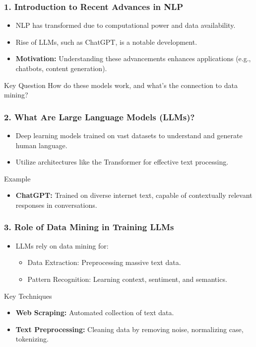 \documentclass[aspectratio=169]{beamer}
\begin{document}
\begin{frame}[fragile]
    \frametitle{1. Introduction to Recent Advances in NLP}
    \begin{itemize}
        \item NLP has transformed due to computational power and data availability.
        \item Rise of LLMs, such as ChatGPT, is a notable development.
        \item \textbf{Motivation:} Understanding these advancements enhances applications (e.g., chatbots, content generation).
    \end{itemize}
    \begin{block}{Key Question}
        How do these models work, and what's the connection to data mining?
    \end{block}
\end{frame}

\begin{frame}[fragile]
    \frametitle{2. What Are Large Language Models (LLMs)?}
    \begin{itemize}
        \item Deep learning models trained on vast datasets to understand and generate human language.
        \item Utilize architectures like the Transformer for effective text processing.
    \end{itemize}
    \begin{block}{Example}
        \begin{itemize}
            \item \textbf{ChatGPT:} Trained on diverse internet text, capable of contextually relevant responses in conversations.
        \end{itemize}
    \end{block}
\end{frame}

\begin{frame}[fragile]
    \frametitle{3. Role of Data Mining in Training LLMs}
    \begin{itemize}
        \item LLMs rely on data mining for:
        \begin{itemize}
            \item Data Extraction: Preprocessing massive text data.
            \item Pattern Recognition: Learning context, sentiment, and semantics.
        \end{itemize}
    \end{itemize}
    \begin{block}{Key Techniques}
        \begin{itemize}
            \item \textbf{Web Scraping:} Automated collection of text data.
            \item \textbf{Text Preprocessing:} Cleaning data by removing noise, normalizing case, tokenizing.
        \end{itemize}
    \end{block}
\end{frame}
\end{document}
